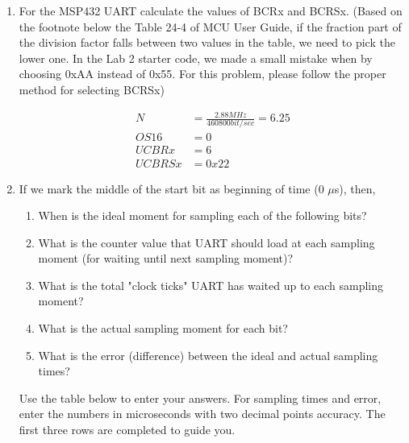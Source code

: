 \documentclass[12pt,letterpaper,titlepage]{article}
\begin{document}
\begin{raggedright}
\begin{enumerate}[label=\alph*)]
\item For the MSP432 UART calculate the values of BCRx and BCRSx. (Based on the footnote below the Table 24-4 of MCU User Guide, if the fraction part of the division factor falls between two values in the table, we need to pick the lower one. In the Lab 2 starter code, we made a small mistake when by choosing 0xAA instead of 0x55. For this problem, please follow the proper method for selecting BCRSx)

\begin{align*}
   N &= \frac{2.88MHz}{460800bit/sec} = 6.25
\\ OS16 &= 0
\\ UCBRx &= 6
\\ UCBRSx &= 0x22
\end{align*}

\pagebreak
\item If we mark the middle of the start bit as beginning of time (0 $\mu$s), then,
\begin{enumerate}[label=\roman*), noitemsep]
\item When is the ideal ​moment for sampling each of the following bits?
\item What is the counter value that UART should load at each sampling moment (for waiting until next sampling moment)?
\item What is the total ​"clock ticks" UART has waited up to each sampling moment?
\item What is the actual ​sampling moment for each bit?
\item What is the error (difference) between the ideal and actual sampling times?
\end{enumerate}
Use the table below to enter your answers. For sampling times and error, enter the numbers in microseconds with two decimal points accuracy. The first three rows are completed to guide you.



\end{enumerate}
\end{raggedright}
\end{document}
